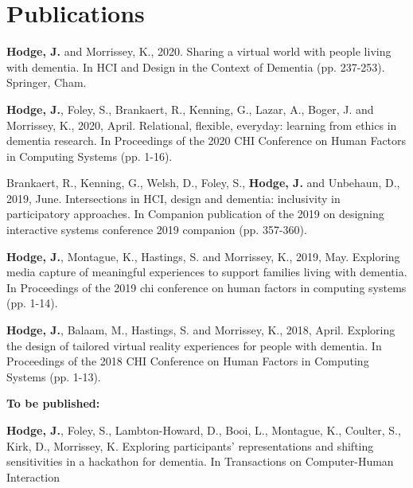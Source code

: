 \chapter{Publications}

\textbf{Hodge, J.} and Morrissey, K., 2020. Sharing a virtual world with people living with dementia. In HCI and Design in the Context of Dementia (pp. 237-253). Springer, Cham.
\newline

\textbf{Hodge, J.}, Foley, S., Brankaert, R., Kenning, G., Lazar, A., Boger, J. and Morrissey, K., 2020, April. Relational, flexible, everyday: learning from ethics in dementia research. In Proceedings of the 2020 CHI Conference on Human Factors in Computing Systems (pp. 1-16).
\newline

Brankaert, R., Kenning, G., Welsh, D., Foley, S., \textbf{Hodge, J.} and Unbehaun, D., 2019, June. Intersections in HCI, design and dementia: inclusivity in participatory approaches. In Companion publication of the 2019 on designing interactive systems conference 2019 companion (pp. 357-360).
\newline

\textbf{Hodge, J.}, Montague, K., Hastings, S. and Morrissey, K., 2019, May. Exploring media capture of meaningful experiences to support families living with dementia. In Proceedings of the 2019 chi conference on human factors in computing systems (pp. 1-14).
\newline

\textbf{Hodge, J.}, Balaam, M., Hastings, S. and Morrissey, K., 2018, April. Exploring the design of tailored virtual reality experiences for people with dementia. In Proceedings of the 2018 CHI Conference on Human Factors in Computing Systems (pp. 1-13).
\newline

\textbf{To be published:}
\newline

\textbf{Hodge, J.}, Foley, S., Lambton-Howard, D., Booi, L., Montague, K., Coulter, S., Kirk, D., Morrissey, K. Exploring participants' representations and shifting sensitivities in a hackathon for dementia. In Transactions on Computer-Human Interaction 
\newline

